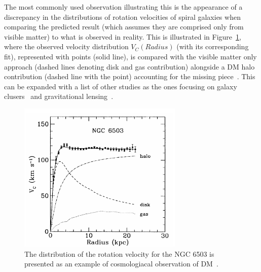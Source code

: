 \hspace{10pt} The most commonly used observation illustrating this is the appearance of a discrepancy in the distributions of rotation velocities of spiral galaxies when comparing the predicted result (which assumes they are comprised only from visible matter) to what is observed in reality. This is illustrated in Figure~\ref{fig:DM}, where the observed velocity distribution $V_C(Radius)$ (with its corresponding fit), represented with points (solid line), is compared with the visible matter only approach (dashed lines denoting disk and gas contribution) alongside a DM halo contribution (dashed line with the point) accounting for the missing piece~\cite{paper:dm_vc}. This can be expanded with a list of other studies as the ones focusing on galaxy clusers~\cite{paper:dm_gal_clust} and gravitational lensing~\cite{paper:dm_grav_lens}.

\begin{figure}[htbp]
    \begin{center}
        \includegraphics[width=0.7\textwidth]{Theory/DM_velocity.png}
        \caption{The distribution of the rotation velocity for the NGC 6503 is presented as an example of cosmologiacal observation of DM~\cite{paper:dm_vc}.}
      \label{fig:DM} 
    \end{center}
  \end{figure}



